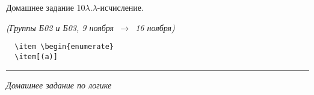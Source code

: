 \documentclass[a4paper,11pt]{article}
\begin{document}
   \newcommand{\enumsep}{\vspace{-2.8mm}
   		\begin{enumerate}[itemsep=0.4mm,leftmargin=2.5mm]}

   \renewcommand{\l}{\ensuremath{\lambda}}
   
   \newcommand{\ltrue}{\text{\bf True}}
   \newcommand{\lfalse}{\text{\bf False}}

\begin{center}
	{\Large Домашнее задание 10\l .\quad\l -исчисление.}

	{\it (Группы Б02 и Б03, 9 ноября\ \(\to\)\ 16 ноября)}
\end{center}

\begin{flushright}
  \begin{minipage}{7cm}
    \begin{verbatim}
  \item \begin{enumerate}
  \item[(а)]
    \end{verbatim} \vspace{-5.5mm} \hrule
  \end{minipage}

{\it Домашнее задание по логике}
\end{flushright}
\end{document}
